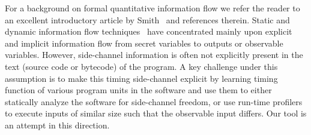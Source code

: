 For a background on formal quantitative information flow we refer the reader to
an excellent introductory article by Smith~\cite{smith09} and references therein.
Static and dynamic information flow techniques~\cite{SR10,Den76} have concentrated
mainly upon explicit and implicit information flow from secret variables to
outputs or observable variables.
However, side-channel information is often not explicitly present in the text
(source code or bytecode) of the program.
A key challenge under this assumption is to make this timing side-channel
explicit by learning timing function of various program units in the software
and use them to either statically analyze the software for side-channel freedom,
or use run-time profilers to execute inputs of similar size such that the
observable input differs.
Our tool is an attempt in this direction.




